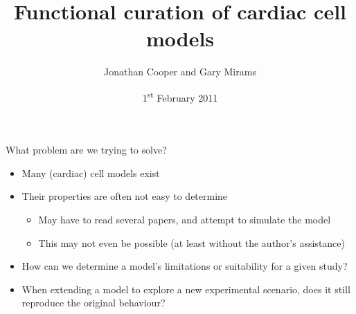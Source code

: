\documentclass[t,xcolor={usenames,dvipsnames}]{beamer}
\title[Functional curation]{Functional curation of cardiac cell models}
\author{Jonathan Cooper and Gary Mirams}
\institute[University of Oxford]
{Computational Biology Group\\
 Oxford University Computing Laboratory}
\date{1\textsuperscript{st} February 2011}
\begin{document}
\begin{frame}
\titlepage
\end{frame}


\begin{frame}{What problem are we trying to solve?}
\begin{itemize}
\item Many (cardiac) cell models exist
\item Their properties are often not easy to determine
  \begin{itemize}
  \item May have to read several papers, and attempt to simulate the model
  \item This may not even be possible (at least without the author's assistance)
  \end{itemize}
\item How can we determine a model's limitations or suitability for a given study?
\item When extending a model to explore a new experimental scenario, does it still reproduce the original behaviour?
\end{itemize}
\end{frame}
\end{document}
